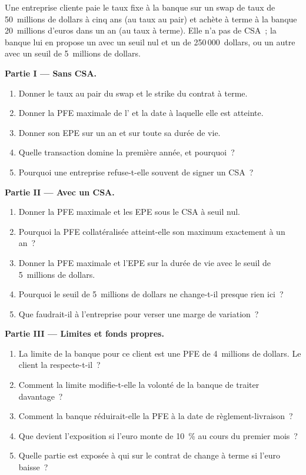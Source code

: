 \begin{problem}\label{pb:rc:counterparty-exposure:1}
Une entreprise cliente paie le taux fixe à la banque sur un swap de taux de 50~millions de dollars à cinq ans (au taux au pair)
et achète à terme à la banque 20~millions d'euros dans un an (au taux à terme). Elle n'a pas de CSA~;
la banque lui en propose un avec un seuil nul et un  de 250\,000~dollars, ou
un autre avec un seuil de 5~millions de dollars.

\medskip\noindent\textbf{Partie I --- Sans CSA.}
\begin{enumerate}
\item Donner le taux au pair du swap et le strike du contrat à terme.
\item Donner la PFE maximale de l' et la date à laquelle elle est atteinte.
\item Donner son EPE sur un an et sur toute sa durée de vie.
\item Quelle transaction domine la première année, et pourquoi~?
\item Pourquoi une entreprise refuse-t-elle souvent de signer un CSA~?
\end{enumerate}

\medskip\noindent\textbf{Partie II --- Avec un CSA.}
\begin{enumerate}[resume]
\item Donner la PFE maximale et les EPE sous le CSA à seuil nul.
\item Pourquoi la PFE collatéralisée atteint-elle son maximum exactement à un an~?
\item Donner la PFE maximale et l'EPE sur la durée de vie avec le seuil de 5~millions de dollars.
\item Pourquoi le seuil de 5~millions de dollars ne change-t-il presque rien ici~?
\item Que faudrait-il à l'entreprise pour verser une marge de variation~?
\end{enumerate}

\medskip\noindent\textbf{Partie III --- Limites et fonds propres.}
\begin{enumerate}[resume]
\item La limite de la banque pour ce client est une PFE de 4~millions de dollars. Le client la respecte-t-il~?
\item Comment la limite modifie-t-elle la volonté de la banque de traiter davantage~?
\item Comment la banque réduirait-elle la PFE à la date de règlement-livraison~?
\item Que devient l'exposition si l'euro monte de 10~\% au cours du premier mois~?
\item Quelle partie est exposée à qui sur le contrat de change à terme si l'euro baisse~?
\end{enumerate}


\end{problem}
